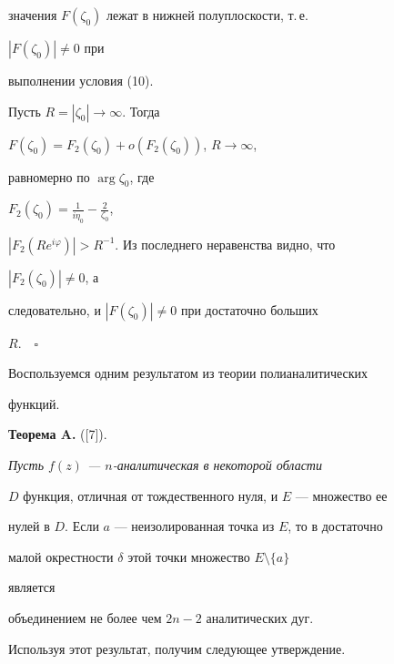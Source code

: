 значения $F(\zeta_0)$ лежат в нижней полуплоскости, т.\,е. 


$|F(\zeta_0)|\ne0$ при 


выполнении условия (10). 


 


Пусть $R=|\zeta_0|\to\infty$. Тогда 


$F(\zeta_0)=F_2(\zeta_0)+o(F_2(\zeta_0))$, $R\to\infty$, 


равномерно по $\arg\zeta_0$, где 


$F_2(\zeta_0)=\frac{1}{i\eta_0}-\frac{2}{\zeta_0}$, 


$|F_2(R e^{i\varphi})|>R^{-1}$. Из последнего неравенства видно, что 


$|F_2(\zeta_0)|\ne0$, а 


следовательно, и $|F(\zeta_0)|\ne0$ при достаточно больших 


$R$.$\quad\square$ 


 


Воспользуемся одним результатом из теории полианалитических 


функций.


\medskip 


 


{\bf Теорема A.} ([7]).


{\it Пусть $f(z)$ --- $n$-аналитическая в некоторой области 


$D$ функция, отличная от тождественного нуля, и $E$ --- множество ее 


нулей в $D$. Если $a$ --- неизолированная точка из $E$, то в достаточно 


малой окрестности $\delta$ этой точки множество $E\setminus\{a\}$ 


является 


объединением не более чем $2n-2$ аналитических дуг.} 


\medskip 


 


Используя этот результат, получим следующее утверждение. 


 



